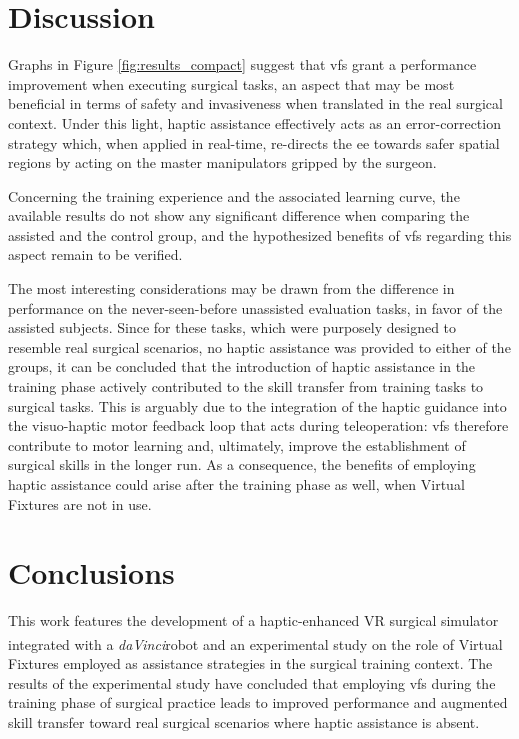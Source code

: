 \documentclass{article}
\newcommand{\cright}{\textsuperscript{\textregistered}\phantom{..}}
\begin{document}
\begin{multicols}{2}
\section{Discussion}
Graphs in Figure \ref{fig:results_compact} suggest that \acp{vf} grant a performance improvement when executing surgical tasks, an aspect that may be most beneficial in terms of safety and invasiveness when translated in the real surgical context. Under this light, haptic assistance effectively acts as an error-correction strategy which, when applied in real-time, re-directs the \ac{ee} towards safer spatial regions by acting on the master manipulators gripped by the surgeon.

Concerning the training experience and the associated learning curve, the available results do not show any significant difference when comparing the assisted and the control group, and the hypothesized benefits of \acp{vf} regarding this aspect remain to be verified.

The most interesting considerations may be drawn from the difference in performance on the never-seen-before unassisted evaluation tasks, in favor of the assisted subjects. Since for these tasks, which were purposely designed to resemble real surgical scenarios, no haptic assistance was provided to either of the groups, it can be concluded that the introduction of haptic assistance in the training phase actively contributed to the skill transfer from training tasks to surgical tasks. This is arguably due to the integration of the haptic guidance into the visuo-haptic motor feedback loop that acts during teleoperation: \acp{vf} therefore contribute to motor learning and, ultimately, improve the establishment of surgical skills in the longer run. As a consequence, the benefits of employing haptic assistance could arise after the training phase as well, when Virtual Fixtures are not in use.
\section{Conclusions}
This work features the development of a haptic-enhanced VR surgical simulator integrated with a \textit{daVinci}\cright robot and an experimental study on the role of Virtual Fixtures employed as assistance strategies in the surgical training context. The results of the experimental study have concluded that employing \acp{vf} during the training phase of surgical practice leads to improved performance and augmented skill transfer toward real surgical scenarios where haptic assistance is absent.



\end{multicols}
\end{document}
